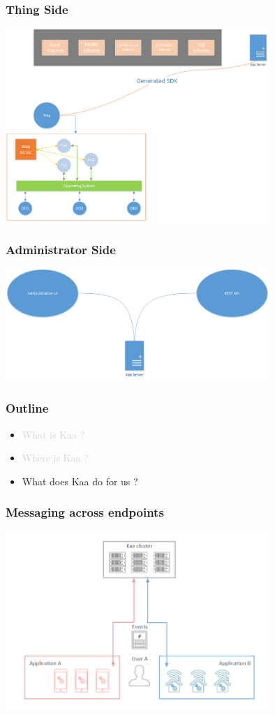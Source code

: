 \documentclass{beamer}
\begin{document}
\begin{frame}
	\frametitle{Thing Side}
	\centering\includegraphics[width=10cm]{diags/kaa-arch-2.png}
\end{frame}

\begin{frame}
	\frametitle{Administrator Side}
	\centering\includegraphics[width=10cm]{diags/kaa-arch-3.png}
\end{frame}

\begin{frame}
	\frametitle{Outline}
	\begin{itemize}
		\item \textcolor{LightGray}{What is Kaa ?}
		\item \textcolor{LightGray}{Where is Kaa ?}
		\item What does Kaa do for us ?
	\end{itemize}
\end{frame}

\begin{frame}
	\frametitle{Messaging across endpoints}
	\centering\includegraphics[width=10cm]{figs/messaging.png}
\end{frame}
\end{document}
